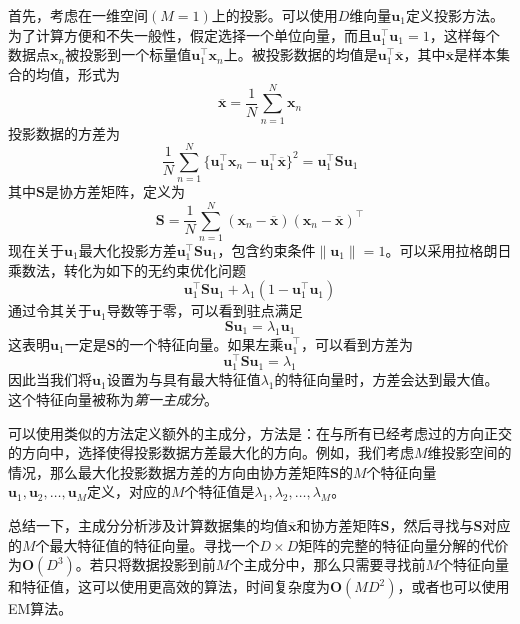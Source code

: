 \documentclass[11pt]{ctexbook}
\begin{document}
首先，考虑在一维空间$(M=1)$上的投影。可以使用$D$维向量$\bm u_1$定义投影方法。为了计算方便和不失一般性，假定选择一个单位向量，而且$\bm u_1^{\top}\bm u_1 = 1$，这样每个数据点$\bm x_n$被投影到一个标量值$\bm u_1^{\top}\bm x_n$上。被投影数据的均值是$\bm u_1^{\top}\overline{\bm x}$，其中$
\overline{\bm x}$是样本集合的均值，形式为
\begin{equation}
	\overline{\bm x} = \frac{1}{N}\sum_{n=1}^{N}\bm x_n
\end{equation}
投影数据的方差为
\begin{equation}
	\frac{1}{N}\sum_{n=1}^{N}\{\bm u_1^{\top}\bm x_n - \bm u_1^{\top}\overline{\bm x}\}^2 = \bm u_1^\top\bm S\bm u_1
\end{equation}
其中$\bm S$是协方差矩阵，定义为
\begin{equation}
	\bm S = \frac{1}{N}\sum_{n=1}^{N}(\bm x_n - \overline{\bm x})(\bm x_n - \overline{\bm x})^\top
\end{equation}
现在关于$\bm u_1$最大化投影方差$\bm u_1^\top\bm S\bm u_1$，包含约束条件$\|\bm u_1\| = 1$。可以采用拉格朗日乘数法，转化为如下的无约束优化问题
\begin{equation}
	\bm u_1^\top \bm S\bm u_1 + \lambda_1(1-\bm u_1^\top\bm u_1)
\end{equation}
通过令其关于$\bm u_1$导数等于零，可以看到驻点满足
\begin{equation}
	\bm S\bm u_1 = \lambda_1\bm u_1
\end{equation}
这表明$\bm u_1$一定是$\bm S$的一个特征向量。如果左乘$\bm u_1^\top$，可以看到方差为
\begin{equation}
	\bm u_1^\top \bm S\bm u_1 = \lambda_1
\end{equation}
因此当我们将$\bm u_1$设置为与具有最大特征值$\lambda_1$的特征向量时，方差会达到最大值。这个特征向量被称为\emph{第一主成分}。

可以使用类似的方法定义额外的主成分，方法是：在与所有已经考虑过的方向正交的方向中，选择使得投影数据方差最大化的方向。例如，我们考虑$M$维投影空间的情况，那么最大化投影数据方差的方向由协方差矩阵$\bm S$的$M$个特征向量$\bm u_1, \bm u_2, \ldots, \bm u_M$定义，对应的$M$个特征值是$\lambda_1, \lambda_2, \ldots, \lambda_M$。

总结一下，主成分分析涉及计算数据集的均值$\overline{\bm x}$和协方差矩阵$\bm S$，然后寻找与$\bm S$对应的$M$个最大特征值的特征向量。寻找一个$D\times D$矩阵的完整的特征向量分解的代价为$\bm O(D^3)$。若只将数据投影到前$M$个主成分中，那么只需要寻找前$M$个特征向量和特征值，这可以使用更高效的算法，时间复杂度为$\bm O(MD^2)$，或者也可以使用EM算法。
\end{document}

